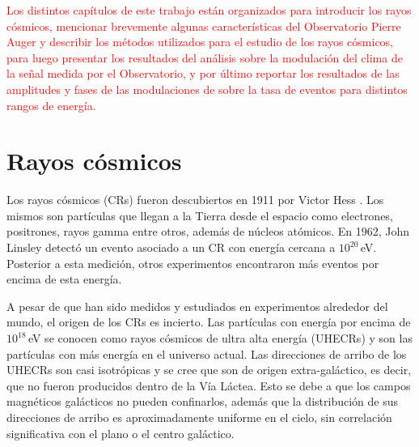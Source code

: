 





\textcolor{red}{Los distintos capítulos de este trabajo están organizados para introducir los rayos cósmicos, mencionar brevemente algunas características del Observatorio Pierre Auger y describir los métodos utilizados para el estudio de los rayos cósmicos, para luego presentar los resultados del análisis sobre la modulación del clima de la señal medida por el Observatorio, y por último reportar los resultados de las amplitudes y fases de las modulaciones de sobre la tasa de eventos para distintos rangos de energía.}
\section{Rayos cósmicos}
Los rayos cósmicos (CRs) fueron descubiertos en 1911 por Victor Hess \cite{hess1912}. Los mismos son partículas que llegan a la Tierra desde el espacio como  electrones, positrones, rayos gamma entre otros, además de núcleos atómicos. En 1962, John Linsley detectó un evento asociado a un CR con energía cercana a $10^{20}\,$eV. Posterior a esta medición, otros experimentos encontraron más eventos por encima de esta energía. 

A pesar de que han sido medidos y estudiados en experimentos alrededor del mundo, el origen de los CRs es incierto. Las partículas con energía por encima de $10^{18}\,$eV se conocen como rayos cósmicos de ultra alta energía (UHECRs) y son las partículas con más energía en el universo actual. Las direcciones de arribo de los UHECRs son casi isotrópicas  \cite{collaboration2013pierre} \cite{data} y se cree que son de origen extra-galáctico, es decir, que no fueron producidos dentro de la Vía Láctea. Esto se debe a que los campos magnéticos galácticos no pueden confinarlos, además que la distribución de sus direcciones de arribo es aproximadamente uniforme en el cielo, sin correlación significativa con el plano o el centro galáctico. 


